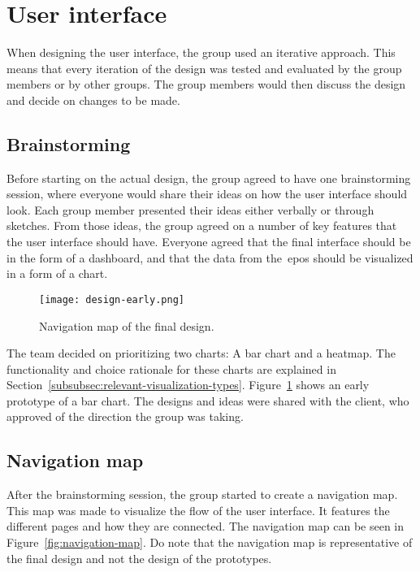 \section{User interface}\label{sec:user-interface}

When designing the user interface, the group used an iterative approach.
This means that every iteration of the design was tested and evaluated by the group members or by other groups.
The group members would then discuss the design and decide on changes to be made.

\subsection{Brainstorming}\label{subsec:brainstorming}

Before starting on the actual design, the group agreed to have one brainstorming session, where everyone would share
their ideas on how the user interface should look.
Each group member presented their ideas either verbally or through sketches.
From those ideas, the group agreed on a number of key features that the user interface should have.
Everyone agreed that the final interface should be in the form of a dashboard, and that the data from
the~\acrshort{epos} should be visualized in a form of a chart.

\begin{figure}[H]
    \centering
    \texttt{[image: design-early.png]}
    \caption{Navigation map of the final design.}\label{fig:design-early}
\end{figure}

The team decided on prioritizing two charts: A bar chart and a heatmap.
The functionality and choice rationale for these charts are explained in
Section~\ref{subsubsec:relevant-visualization-types}.
Figure~\ref{fig:design-early} shows an early prototype of a bar chart.
The designs and ideas were shared with the client, who approved of the direction the group was taking.

\subsection{Navigation map}\label{subsec:navigation-map}

After the brainstorming session, the group started to create a navigation map.
This map was made to visualize the flow of the user interface.
It features the different pages and how they are connected.
The navigation map can be seen in Figure~\ref{fig:navigation-map}.
Do note that the navigation map is representative of the final design and not the design of the prototypes.


